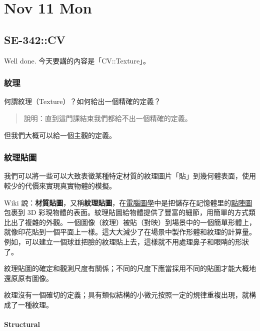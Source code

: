 \documentclass[
]{article}
\date{}
\begin{document}
\hypertarget{header-n0}{%
\section{Nov 11 Mon}\label{header-n0}}

\hypertarget{header-n2}{%
\subsection{SE-342::CV}\label{header-n2}}

Well done. 今天要講的內容是「CV::Texture」。

\hypertarget{header-n4}{%
\subsubsection{紋理}\label{header-n4}}

何謂紋理（Texture）？如何給出一個精確的定義？

\begin{quote}
說明：直到這門課結束我們都給不出一個精確的定義。
\end{quote}

但我們大概可以給一個主觀的定義。

\hypertarget{header-n9}{%
\subsubsection{紋理貼圖}\label{header-n9}}

我們可以將一些可以大致表徵某種特定材質的紋理圖片「貼」到幾何體表面，使用較少的代價來實現真實物體的模擬。

Wiki
說：\textbf{材質貼圖}，又稱\textbf{紋理貼圖}，在\href{https://zh.wikipedia.org/wiki/计算机图形学}{電腦圖學}中是把儲存在記憶體里的\href{https://zh.wikipedia.org/wiki/位图}{點陣圖}包裹到
3D
彩現物體的表面。紋理貼圖給物體提供了豐富的細節，用簡單的方式類比出了複雜的外觀。一個圖像（紋理）被貼（對映）到場景中的一個簡單形體上，就像印花貼到一個平面上一樣。這大大減少了在場景中製作形體和紋理的計算量。例如，可以建立一個球並把臉的紋理貼上去，這樣就不用處理鼻子和眼睛的形狀了。

紋理貼圖的確定和觀測尺度有關係；不同的尺度下應當採用不同的貼圖才能大概地還原原有圖像。

紋理沒有一個確切的定義；具有類似結構的小微元按照一定的規律重複出現，就構成了一種紋理。

\hypertarget{header-n14}{%
\paragraph{Structural}\label{header-n14}}
\end{document}
